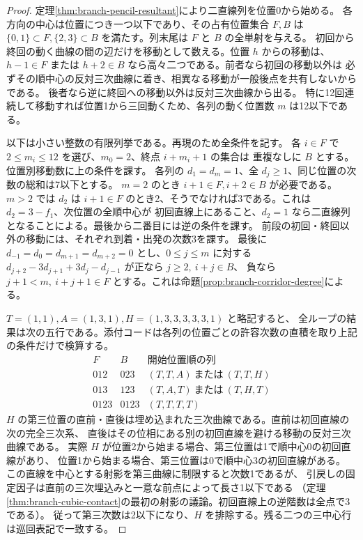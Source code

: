 \begin{proof}
定理\ref{thm:branch-pencil-resultant}により二直線列を位置0から始める。
各方向の中心は位置につき一つ以下であり、その占有位置集合 $F,B$ は
$\{0,1\}\subset F,\{2,3\}\subset B$ を満たす。列末尾は $F$ と $B$ の全単射を与える。
初回から終回の動く曲線の間の辺だけを移動として数える。位置 $h$ からの移動は、
$h-1\in F$ または $h+2\in B$ なら高々二つである。前者なら初回の移動以外は
必ずその順中心の反対三次曲線に着き、相異なる移動が一般後点を共有しないからである。
後者なら逆に終回への移動以外は反対三次曲線から出る。
特に12回連続して移動すれば位置1から三回動くため、各列の動く位置数 $m$ は12以下である。

以下は小さい整数の有限列挙である。再現のため全条件を記す。
各 $i\in F$ で $2\le m_i\le12$ を選び、$m_0=2$、終点 $i+m_i+1$ の集合は
重複なしに $B$ とする。位置別移動数に上の条件を課す。
各列の $d_1=d_m=1$、全 $d_j\ge1$、同じ位置の次数の総和は7以下とする。
$m=2$ のとき $i+1\in F,i+2\in B$ が必要である。$m>2$ では $d_2$ は
$i+1\in F$ のとき2、そうでなければ3である。これは $d_2=3-f_1$、次位置の全順中心が
初回直線上にあること、$d_2=1$ なら二直線列となることによる。最後から二番目には逆の条件を課す。
前段の初回・終回以外の移動には、それぞれ到着・出発の次数3を課す。
最後に $d_{-1}=d_0=d_{m+1}=d_{m+2}=0$ とし、$0\le j\le m$ に対する
$d_{j+2}-3d_{j+1}+3d_j-d_{j-1}$ が正なら $j\ge2,\ i+j\in B$、
負なら $j+1<m,\ i+j+1\in F$ とする。これは命題\ref{prop:branch-corridor-degree}による。

$T=(1,1), A=(1,3,1), H=(1,3,3,3,3,3,1)$ と略記すると、
全ループの結果は次の五行である。添付コードは各列の位置ごとの許容次数の直積を取り上記の条件だけで検算する。
\[
\begin{array}{c|c|c}
F&B&\text{開始位置順の列}\\\hline
012&023&(T,T,A)\ \text{または}\ (T,T,H)\\
013&123&(T,A,T)\ \text{または}\ (T,H,T)\\
0123&0123&(T,T,T,T)
\end{array}
\]
$H$ の第三位置の直前・直後は埋め込まれた三次曲線である。直前は初回直線の次の完全三次系、
直後はその位相にある別の初回直線を避ける移動の反対三次曲線である。
実際 $H$ が位置2から始まる場合、第三位置は1で順中心0の初回直線があり、
位置1から始まる場合、第三位置は0で順中心3の初回直線がある。
この直線を中心とする射影を第三曲線に制限すると次数1であるが、
引戻しの固定因子は直前の三次埋込みと一意な前点によって長さ1以下である
（定理\ref{thm:branch-cubic-contact}の最初の射影の議論。初回直線上の逆階数は全点で3である）。
従って第三次数は2以下になり、$H$ を排除する。残る二つの三中心行は巡回表記で一致する。
\end{proof}
